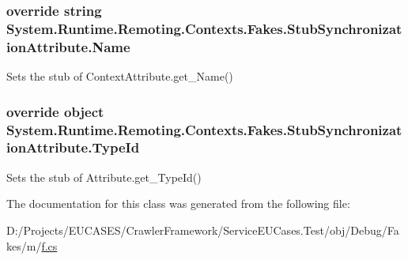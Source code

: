 \hypertarget{class_system_1_1_runtime_1_1_remoting_1_1_contexts_1_1_fakes_1_1_stub_synchronization_attribute_a577ae593753cd7833f1e3797d2a4c3b5}{
\subsubsection[{Name}]{\setlength{\rightskip}{0pt plus 5cm}override string System.\-Runtime.\-Remoting.\-Contexts.\-Fakes.\-Stub\-Synchronization\-Attribute.\-Name\hspace{0.3cm}{\ttfamily [get]}}}\label{class_system_1_1_runtime_1_1_remoting_1_1_contexts_1_1_fakes_1_1_stub_synchronization_attribute_a577ae593753cd7833f1e3797d2a4c3b5}


Sets the stub of Context\-Attribute.\-get\-\_\-\-Name()

\hypertarget{class_system_1_1_runtime_1_1_remoting_1_1_contexts_1_1_fakes_1_1_stub_synchronization_attribute_a992def3362f074f751735518318e0950}{
\subsubsection[{Type\-Id}]{\setlength{\rightskip}{0pt plus 5cm}override object System.\-Runtime.\-Remoting.\-Contexts.\-Fakes.\-Stub\-Synchronization\-Attribute.\-Type\-Id\hspace{0.3cm}{\ttfamily [get]}}}\label{class_system_1_1_runtime_1_1_remoting_1_1_contexts_1_1_fakes_1_1_stub_synchronization_attribute_a992def3362f074f751735518318e0950}


Sets the stub of Attribute.\-get\-\_\-\-Type\-Id()



The documentation for this class was generated from the following file\-:\begin{DoxyCompactItemize}
\item 
D\-:/\-Projects/\-E\-U\-C\-A\-S\-E\-S/\-Crawler\-Framework/\-Service\-E\-U\-Cases.\-Test/obj/\-Debug/\-Fakes/m/\hyperlink{m_2f_8cs}{f.\-cs}\end{DoxyCompactItemize}
